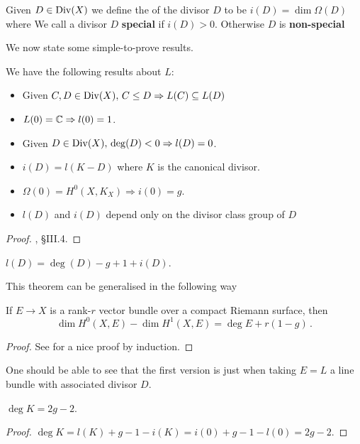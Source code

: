 \documentclass{article}
\begin{document}
\begin{definition}
	Given $D \in \operatorname{Div}(X)$ we define the  of the divisor $D$ to be $i(D) = \dim \Omega(D)$ where
We call a divisor $D$ \textbf{special} if $i(D)>0$. Otherwise $D$ is \textbf{non-special}
\end{definition}

We now state some simple-to-prove results.
\begin{prop}\label{prop: properties of l(D) and i(D)}
	We have the following results about $L$:
	\begin{itemize}
		\item Given $C,D \in \operatorname{Div}(X), \, C \leq D \Rightarrow L(C) \subseteq L(D)$
		\item $L(0) = \mathbb{C} \Rightarrow l(0) = 1$. 
		\item Given $D \in \operatorname{Div}(X), \, \deg(D)<0 \Rightarrow l(D) = 0$. 
		\item $i(D) = l(K-D)$ where $K$ is the canonical divisor.
		\item $\Omega(0) = H^0(X,K_X) \Rightarrow i(0) = g$. 
		\item $l(D)$ and $i(D)$ depend only on the divisor class group of $D$
	\end{itemize}
\end{prop}
\begin{proof}
\cite{Farkas1992}, \S III.4.
\end{proof}

\begin{theorem} \label{Thm: Riemann-Roch}
	$l(D) = \deg(D) -g+1 + i(D)$.
\end{theorem}
This theorem can be generalised in the following way
\begin{theorem}
	If $E\to X$ is a rank-$r$ vector bundle over a compact Riemann surface, then 
	\[
	\dim H^0(X,E) - \dim H^1(X,E) = \deg E + r(1-g) \, .
	\]
\end{theorem}
\begin{proof}
See \cite{Hitchin1999} for a nice proof by induction. 
\end{proof}
\begin{remark}
One should be able to see that the first version is just when taking $E=L$ a line bundle with associated divisor $D$. 
\end{remark}
\begin{corollary}
	$\deg K = 2g-2$. 
\end{corollary}
\begin{proof}
	$\deg K = l(K) +g-1-i(K) = i(0)+g-1-l(0)=2g-2$. 
\end{proof}
\end{document}
